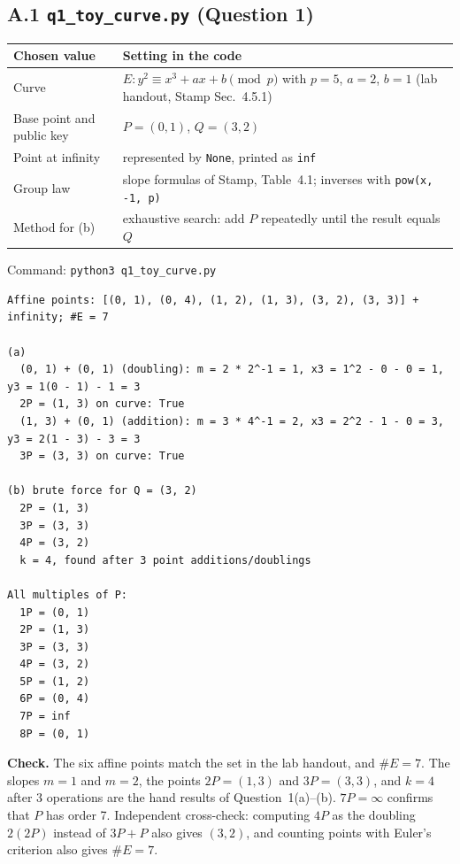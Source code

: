 \documentclass[11pt,a4paper]{article}
\begin{document}
\subsection*{A.1 \texttt{q1\_toy\_curve.py} (Question 1)}
\begin{table}[H]
\centering\small
\begin{tabularx}{\textwidth}{@{}P{4.2cm}L@{}}
\toprule
Chosen value & Setting in the code \\
\midrule
Curve & $E: y^2 \equiv x^3 + ax + b \pmod p$ with $p = 5$, $a = 2$, $b = 1$ (lab handout, Stamp Sec.~4.5.1) \\
Base point and public key & $P = (0,1)$, $Q = (3,2)$ \\
Point at infinity & represented by \texttt{None}, printed as \texttt{inf} \\
Group law & slope formulas of Stamp, Table~4.1; inverses with \texttt{pow(x, -1, p)} \\
Method for (b) & exhaustive search: add $P$ repeatedly until the result equals $Q$ \\
\bottomrule
\end{tabularx}
\end{table}
Command: \texttt{python3 q1\_toy\_curve.py}
\begin{Verbatim}[fontsize=\footnotesize, frame=single]
Affine points: [(0, 1), (0, 4), (1, 2), (1, 3), (3, 2), (3, 3)] + infinity; #E = 7

(a)
  (0, 1) + (0, 1) (doubling): m = 2 * 2^-1 = 1, x3 = 1^2 - 0 - 0 = 1, y3 = 1(0 - 1) - 1 = 3
  2P = (1, 3) on curve: True
  (1, 3) + (0, 1) (addition): m = 3 * 4^-1 = 2, x3 = 2^2 - 1 - 0 = 3, y3 = 2(1 - 3) - 3 = 3
  3P = (3, 3) on curve: True

(b) brute force for Q = (3, 2)
  2P = (1, 3)
  3P = (3, 3)
  4P = (3, 2)
  k = 4, found after 3 point additions/doublings

All multiples of P:
  1P = (0, 1)
  2P = (1, 3)
  3P = (3, 3)
  4P = (3, 2)
  5P = (1, 2)
  6P = (0, 4)
  7P = inf
  8P = (0, 1)
\end{Verbatim}
\textbf{Check.} The six affine points match the set in the lab handout, and $\#E = 7$. The slopes $m = 1$ and $m = 2$,
the points $2P = (1,3)$ and $3P = (3,3)$, and $k = 4$ after 3 operations are the hand results of Question~1(a)--(b).
$7P = \infty$ confirms that $P$ has order 7. Independent cross-check: computing $4P$ as the doubling $2(2P)$ instead of
$3P + P$ also gives $(3,2)$, and counting points with Euler's criterion also gives $\#E = 7$.
\end{document}
